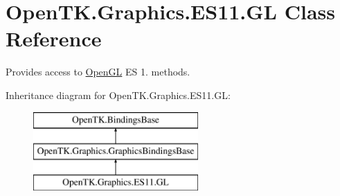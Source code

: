 \hypertarget{class_open_t_k_1_1_graphics_1_1_e_s11_1_1_g_l}{\section{Open\-T\-K.\-Graphics.\-E\-S11.\-G\-L Class Reference}
\label{class_open_t_k_1_1_graphics_1_1_e_s11_1_1_g_l}
}


Provides access to \hyperlink{namespace_open_t_k_1_1_graphics_1_1_open_g_l}{Open\-G\-L} E\-S 1. methods.  


Inheritance diagram for Open\-T\-K.\-Graphics.\-E\-S11.\-G\-L\-:\begin{figure}[H]
\begin{center}
\leavevmode
\includegraphics[height=3.000000cm]{class_open_t_k_1_1_graphics_1_1_e_s11_1_1_g_l}
\end{center}
\end{figure}
